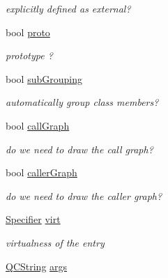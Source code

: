 \begin{DoxyCompactItemize}
\begin{DoxyCompactList}\small\item\em explicitly defined as external? \end{DoxyCompactList}\item 
\hypertarget{class_entry_a98b3155ab216f9fbf72c95d6c22bdeb5}{bool \hyperlink{class_entry_a98b3155ab216f9fbf72c95d6c22bdeb5}{proto}}\label{class_entry_a98b3155ab216f9fbf72c95d6c22bdeb5}

\begin{DoxyCompactList}\small\item\em prototype ? \end{DoxyCompactList}\item 
\hypertarget{class_entry_a6c0b6dfd8da3027f83dfdbfeffce7706}{bool \hyperlink{class_entry_a6c0b6dfd8da3027f83dfdbfeffce7706}{sub\-Grouping}}\label{class_entry_a6c0b6dfd8da3027f83dfdbfeffce7706}

\begin{DoxyCompactList}\small\item\em automatically group class members? \end{DoxyCompactList}\item 
\hypertarget{class_entry_a96821a926ce09ac135f980b6b23e82d7}{bool \hyperlink{class_entry_a96821a926ce09ac135f980b6b23e82d7}{call\-Graph}}\label{class_entry_a96821a926ce09ac135f980b6b23e82d7}

\begin{DoxyCompactList}\small\item\em do we need to draw the call graph? \end{DoxyCompactList}\item 
\hypertarget{class_entry_af314ff2b6a29ca01c32849ae6e65d4d6}{bool \hyperlink{class_entry_af314ff2b6a29ca01c32849ae6e65d4d6}{caller\-Graph}}\label{class_entry_af314ff2b6a29ca01c32849ae6e65d4d6}

\begin{DoxyCompactList}\small\item\em do we need to draw the caller graph? \end{DoxyCompactList}\item 
\hypertarget{class_entry_aa05b4729c780621416429c6aac10fccf}{\hyperlink{types_8h_ab16236bdd10ddf4d73a9847350f0017e}{Specifier} \hyperlink{class_entry_aa05b4729c780621416429c6aac10fccf}{virt}}\label{class_entry_aa05b4729c780621416429c6aac10fccf}

\begin{DoxyCompactList}\small\item\em virtualness of the entry \end{DoxyCompactList}\item 
\hypertarget{class_entry_a5691dacbac7b651cd43288adc0d0328b}{\hyperlink{class_q_c_string}{Q\-C\-String} \hyperlink{class_entry_a5691dacbac7b651cd43288adc0d0328b}{args}}\label{class_entry_a5691dacbac7b651cd43288adc0d0328b}


\end{DoxyCompactItemize}
